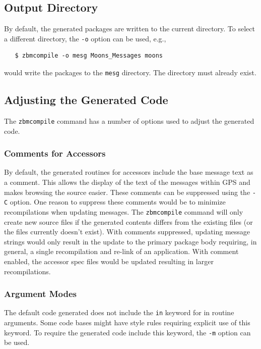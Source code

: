 \subsection{Output Directory}

By default, the generated packages are written to the current directory.  To
select a different directory, the \verb|-o| option can be used, e.g.,
\begin{xmpl}
\begin{verbatim}
   $ zbmcompile -o mesg Moons_Messages moons
\end{verbatim}
\end{xmpl}
would write the packages to the \verb|mesg| directory.  The directory must
already exist.

\subsection{Adjusting the Generated Code}

The \verb|zbmcompile| command has a number of options used to adjust the
generated code.

\subsubsection{Comments for Accessors}

By default, the generated routines for accessors include the base message
text as a comment.  This allows the display of the text of the messages within
GPS and makes browsing the source easier.  These comments can be suppressed
using the \verb|-C| option.  One reason to suppress these comments would be
to minimize recompilations when updating messages.  The \verb|zbmcompile|
command will only create new source files if the generated contents differs
from the existing files (or the files currently doesn't exist).  With
comments suppressed, updating message strings would only result in the update
to the primary package body requiring, in general, a single recompilation and
re-link of an application.  With comment enabled, the accessor spec files
would be updated resulting in larger recompilations.

\subsubsection{Argument Modes}

The default code generated does not include the \verb|in| keyword for in
routine arguments.  Some code bases might have style rules requiring explicit
use of this keyword.  To require the generated code include this keyword, the
\verb|-m| option can be used.

